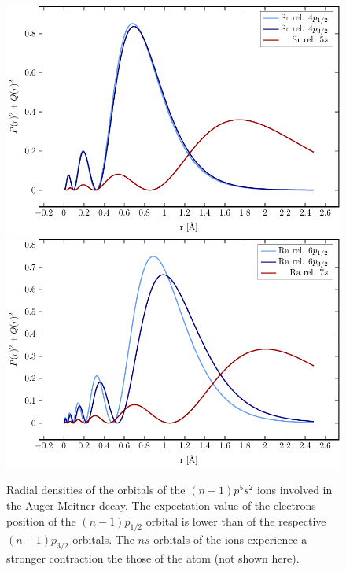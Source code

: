 

\begin{figure}[h]
 \centering
 \includegraphics[width=\columnwidth]{pics/sr_ion_R.pdf}\\
 \includegraphics[width=\columnwidth]{pics/ra_ion_R.pdf}\\
 \caption{Radial densities of the orbitals of the $(n-1)p^5s^2$ ions
          involved in the Auger-Meitner decay.
          The expectation value of the electrons position of the $(n-1)p_{1/2}$
          orbital is lower than of the respective $(n-1)p_{3/2}$
          orbitals. The $ns$ orbitals of the ions experience a stronger
          contraction the those of the atom (not shown here).}
 \label{fig:radial_pure}
\end{figure}

